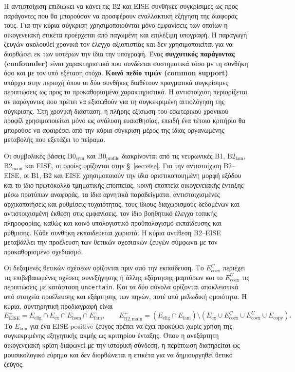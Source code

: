\documentclass[11pt,a4paper]{article}
\begin{document}
Η αντιστοίχιση επιδιώκει να κάνει τις B2 και EISE συνθήκες συγκρίσιμες ως προς παράγοντες που θα μπορούσαν να προσφέρουν εναλλακτική εξήγηση της διαφοράς τους. Για την κύρια σύγκριση χρησιμοποιούνται μόνο εμφανίσεις των οποίων η οικογενειακή ετικέτα προέρχεται από παγωμένη και επιλέξιμη υπογραφή. Η παραγωγή ζευγών ακολουθεί χρονικά τον έλεγχο αξιοπιστίας και δεν χρησιμοποιείται για να διορθώσει εκ των υστέρων την ίδια την υπογραφή. Ένας \textbf{συγχυτικός παράγοντας (confounder)} είναι χαρακτηριστικό που συνδέεται συστηματικά τόσο με τη συνθήκη όσο και με τον υπό εξέταση στόχο. \textbf{Κοινό πεδίο τιμών (common support)} υπάρχει στην περιοχή όπου οι δύο συνθήκες διαθέτουν πραγματικά συγκρίσιμες περιπτώσεις ως προς τα προκαθορισμένα χαρακτηριστικά. Η αντιστοίχιση περιορίζεται σε παράγοντες που πρέπει να εξισωθούν για τη συγκεκριμένη αιτιολόγηση της σύγκρισης. Στη χρονική διάσταση, η πλήρης εξίσωση του εσωτερικού χρονικού προφίλ χρησιμοποιείται μόνο ως ανάλυση ευαισθησίας, επειδή ένα τέτοιο κριτήριο θα μπορούσε να αφαιρέσει από την κύρια σύγκριση μέρος της ίδιας οργανωμένης μεταβολής που εξετάζει το πείραμα.

Οι συμβολικές βάσεις $\mathrm{B0}_{\mathrm{sym}}$ και $\mathrm{B0}_{\mathrm{profile}}$ διακρίνονται από τις νευρωνικές B1, $\mathrm{B2}_{\mathrm{fam}}$, $\mathrm{B2}_{\mathrm{main}}$ και EISE, οι οποίες ορίζονται στην §~\ref{sec:eise}. Για την αντιστοίχιση B2--EISE, οι B1, B2 και EISE χρησιμοποιούν την ίδια οριστικοποιημένη μορφή εξόδου και το ίδιο πρωτόκολλο τμηματικής εποπτείας, κοινή εποπτεία οικογενειακής ένταξης μέσω προτύπων αναφοράς, τα ίδια αρνητικά παραδείγματα, αντιστοιχισμένες αρχικοποιήσεις και ρυθμίσεις τυχαιότητας, τους ίδιους διαχωρισμούς δεδομένων και αντιστοιχισμένη έκθεση στις εμφανίσεις, τον ίδιο βοηθητικό έλεγχο τοπικής πληροφορίας, καθώς και κοινό υπολογιστικό προϋπολογισμό εκπαίδευσης και ρύθμισης. Κάθε συνθήκη εκπαιδεύεται χωριστά. Η κύρια αντίθεση B2--EISE μεταβάλλει την προέλευση των θετικών σχεσιακών ζευγών σύμφωνα με τον προκαθορισμένο σχεδιασμό.

Οι δεξαμενές θετικών σχέσεων ορίζονται πριν από την εκπαίδευση. Το $E_{\mathrm{coex}}^{C}$ περιέχει τις επιβεβαιωμένες σχέσεις συνεξήγησης ή άλλης εξάρτησης μαρτύρων και το $E_{\mathrm{coex}}^{U}$ τις περιπτώσεις με κατάσταση \texttt{uncertain}. Και τα δύο σύνολα ορίζονται αποκλειστικά από στοιχεία προέλευσης και εξάρτησης των πηγών, ποτέ από μελωδική ομοιότητα. Η κύρια, συντηρητική προδιαγραφή είναι
\[
E_{\mathrm{EISE}}^+=E_{\mathrm{elig}}\cap E_{\mathrm{ex}}\cap E_{\mathrm{hom}}\cap E_{\mathrm{fam}},
\qquad
E_{\mathrm{B2,main}}^+=(E_{\mathrm{elig}}\cap E_{\mathrm{fam}})\setminus(E_{\mathrm{ex}}\cup E_{\mathrm{coex}}^{C}\cup E_{\mathrm{coex}}^{U}\cup E_{\mathrm{copy}}).
\]
Το $E_{\mathrm{fam}}$ για ένα EISE-positive ζεύγος πρέπει να έχει προκύψει χωρίς χρήση της συγκεκριμένης εξηγητικής ακμής ως κριτηρίου ένταξης. Όπου η ανεξάρτητη οικογενειακή κρίση διαφωνεί με την ιστορική σύνδεση, η περίπτωση διατηρείται ως μουσικολογικό εύρημα και δεν διορθώνεται η ετικέτα για να δημιουργηθεί θετικό ζεύγος.
\end{document}
